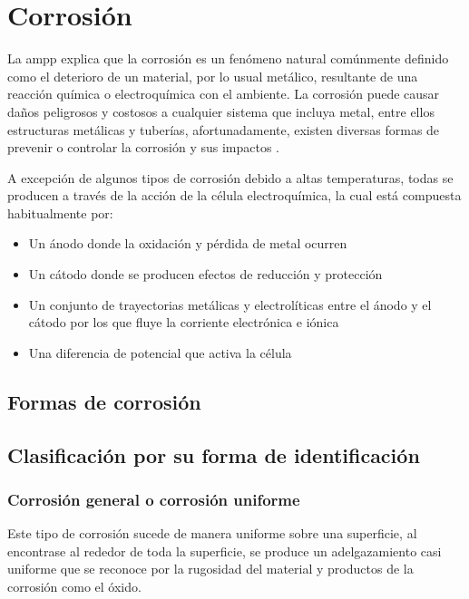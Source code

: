 \section{Corrosión}

		La \acrfull{ampp} explica que la corrosión es un fenómeno natural comúnmente definido como el deterioro de un material, por lo usual metálico, resultante de una reacción química o electroquímica con el ambiente. La corrosión puede causar daños peligrosos y costosos a cualquier sistema que incluya metal, entre ellos estructuras metálicas y tuberías, afortunadamente, existen diversas formas de prevenir o controlar la corrosión y sus impactos \cite{ampp_what_nodate}.

		A excepción de algunos tipos de corrosión debido a altas temperaturas, todas se producen a través de la acción de la célula electroquímica, la cual está compuesta habitualmente por:

		\begin{itemize}[columns=2]
			\item Un ánodo donde la oxidación y pérdida de metal ocurren
			\item Un cátodo donde se producen efectos de reducción y protección
			\item Un conjunto de trayectorias metálicas y electrolíticas entre el ánodo y el cátodo por los que fluye la corriente electrónica e iónica
			\item Una diferencia de potencial que activa la célula
		\end{itemize}

		\subsection{Formas de corrosión}

			\subsection{Clasificación por su forma de identificación}


			\subsubsection{Corrosión general o corrosión uniforme}

				Este tipo de corrosión sucede de manera uniforme sobre una superficie, al encontrase al rededor de toda la superficie, se produce un adelgazamiento casi uniforme que se reconoce por la rugosidad del material y productos de la corrosión como el óxido.


